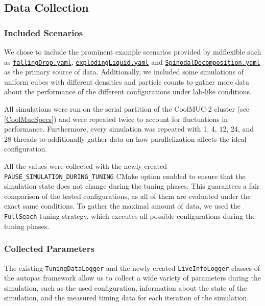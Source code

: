 \subsection{Data Collection}

\subsubsection{Included Scenarios}

We chose to include the prominent example scenarios provided by \gls{mdflexible} such as \href{https://github.com/AutoPas/AutoPas/blob/c25dc770f173ff160630d7e58f59b38e277032a1/examples/md-flexible/input/fallingDrop.yaml}{\color{blue}\texttt{fallingDrop.yaml}}, \href{https://github.com/AutoPas/AutoPas/blob/c25dc770f173ff160630d7e58f59b38e277032a1/examples/md-flexible/input/explodingLiquid.yaml}{\color{blue} \texttt{explodingLiquid.yaml}} and \href{https://github.com/AutoPas/AutoPas/blob/c25dc770f173ff160630d7e58f59b38e277032a1/examples/md-flexible/input/SpinodalDecomposition.yaml}{\color{blue} \texttt{SpinodalDecomposition.yaml}} as the primary source of data. Additionally, we included some simulations of uniform cubes with different densities and particle counts to gather more data about the performance of the different configurations under lab-like conditions.

All simulations were run on the serial partition of the CoolMUC-2 cluster (see \ref*{CoolMucSpecs})  and were repeated twice to account for fluctuations in performance. Furthermore, every simulation was repeated with 1, 4, 12, 24, and 28 threads to additionally gather data on how parallelization affects the ideal configuration.

All the values were collected with the newly created \texttt{PAUSE\_SIMULATION\_DURING\_TUNING} CMake option enabled to ensure that the simulation state does not change during the tuning phases. This guarantees a fair comparison of the tested configurations, as all of them are evaluated under the exact same conditions. To gather the maximal amount of data, we used the \texttt{FullSeach} tuning strategy, which executes all possible configurations during the tuning phases.


\subsubsection{Collected Parameters}

The existing \texttt{TuningDataLogger} and the newly created \texttt{LiveInfoLogger} classes of the \gls{autopas} framework allow us to collect a wide variety of parameters during the simulation, such as the used configuration, information about the state of the simulation, and the measured timing data for each iteration of the simulation.

